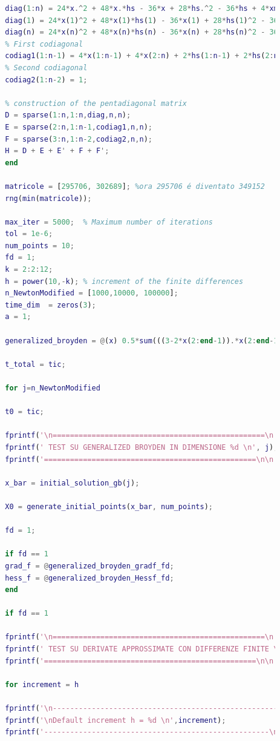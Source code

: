 \documentclass[a4paper,12pt]{article}
\begin{document}
\begin{lstlisting}[language=Matlab,caption={Full script: Modified Newton method on Generalyzed Broyden},label={lst:broyden}]
		% Diagonal
		diag(1:n) = 24*x.^2 + 48*x.*hs - 36*x + 28*hs.^2 - 36*hs + 4*xm1 + 4*xp1 + 7;
		diag(1) = 24*x(1)^2 + 48*x(1)*hs(1) - 36*x(1) + 28*hs(1)^2 - 36*hs(1) + 4*x(2) + 6;
		diag(n) = 24*x(n)^2 + 48*x(n)*hs(n) - 36*x(n) + 28*hs(n)^2 - 36*hs(n) + 4*x(n-1) + 6;
		% First codiagonal
		codiag1(1:n-1) = 4*x(1:n-1) + 4*x(2:n) + 2*hs(1:n-1) + 2*hs(2:n) - 6;
		% Second codiagonal
		codiag2(1:n-2) = 1;
		
		% construction of the pentadiagonal matrix
		D = sparse(1:n,1:n,diag,n,n);
		E = sparse(2:n,1:n-1,codiag1,n,n);
		F = sparse(3:n,1:n-2,codiag2,n,n);
		H = D + E + E' + F + F';
		end
		
		matricole = [295706, 302689]; %ora 295706 é diventato 349152
		rng(min(matricole));
		
		max_iter = 5000;  % Maximum number of iterations
		tol = 1e-6;
		num_points = 10;
		fd = 1;
		k = 2:2:12; 
		h = power(10,-k); % increment of the finite differences 
		n_NewtonModified = [1000,10000, 100000];
		time_dim  = zeros(3);   
		a = 1;
		
		generalized_broyden = @(x) 0.5*sum(((3-2*x(2:end-1)).*x(2:end-1)+1-x(1:end-2)-x(3:end)).^2);
		
		t_total = tic;
		
		for j=n_NewtonModified
		
		t0 = tic;
		
		fprintf('\n=================================================\n');
		fprintf(' TEST SU GENERALIZED BROYDEN IN DIMENSIONE %d \n', j);
		fprintf('=================================================\n\n');
		
		x_bar = initial_solution_gb(j);
		
		X0 = generate_initial_points(x_bar, num_points);
		
		fd = 1;
		
		if fd == 1
		grad_f = @generalized_broyden_gradf_fd;
		hess_f = @generalized_broyden_Hessf_fd;
		end
		
		if fd == 1
		
		fprintf('\n=================================================\n');
		fprintf(' TEST SU DERIVATE APPROSSIMATE CON DIFFERENZE FINITE \n');
		fprintf('=================================================\n\n');
		
		for increment = h
		
		fprintf('\n----------------------------------------------------');
		fprintf('\nDefault increment h = %d \n',increment);
		fprintf('----------------------------------------------------\n');
		

\end{lstlisting}
\end{document}
